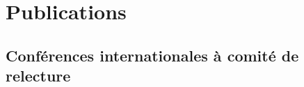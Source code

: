 \documentclass[11pt]{moderncv}
\begin{document}
\section{Publications}
\begingroup
\renewcommand{\section}[1]{}%
\sethintscolumntowidth{[1]}
\renewcommand{\refname}{}
\nocite{Simatic17a, Skaf17, Qaisar17, El-Hadbi17, Simatic16a, Simatic16, Simatic15}

\subsection{Conférences internationales à comité de relecture}

\endgroup
\end{document}
